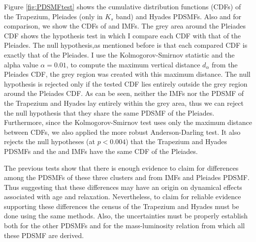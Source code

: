 Figure \ref{fig:PDSMFtest} shows the cumulative distribution functions (CDFs) of the Trapezium, Pleiades (only in $K_s$ band) and Hyades PDSMFs. Also and for comparison, we show the CDFs of \citet{Chabrier2005} and \citet{Thies2007} IMFs. The grey area around the Pleiades CDF shows the hypothesis test in which I compare each CDF with that of the Pleiades. The null hypothesis,as mentioned before is that each compared CDF is exactly that of the Pleiades. I use the Kolmogorov-Smirnov statistic and the alpha value $\alpha = 0.01$, to compute the maximum vertical distance $d_{\alpha}$ from the Pleiades CDF, the grey region was created with this maximum distance. The null hypothesis is rejected only if the tested CDF lies entirely outside the grey region around the Pleiades CDF. As can be seen, neither the IMFs nor the PDSMF of the Trapezium and Hyades lay entirely within the grey area, thus we can reject the null hypothesis that they share the same PDSMF of the Pleiades. Furthermore, since the Kolmogorov-Smirnov test uses only the maximum distance between CDFs, we also applied the more robust Anderson-Darling test. It also rejects the null hypotheses (at $p < 0.004$) that the Trapezium and Hyades PDSMFs and the \citet{Chabrier2005} and \citet{Thies2007} IMFs have the same CDF of the Pleiades. 

The previous tests show that there is enough evidence to claim for differences among the PDSMFs of these three clusters and from IMFs and Pleiades PDSMF. Thus suggesting that these differences may have an origin on dynamical effects associated with age and relaxation. Nevertheless, to claim for reliable evidence supporting these differences the census of the Trapezium and Hyades must be done using the same methods. Also, the uncertainties must be properly establish both for the other PDSMFs and for the mass-luminosity relation from which all these PDSMF are derived. 




